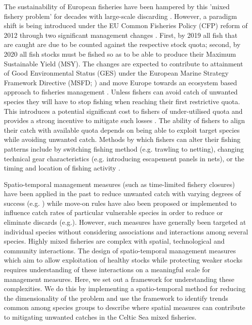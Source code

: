 \documentclass{nature}
\begin{document}
\begin{linenumbers}
The sustainability of European fisheries have been hampered by this 'mixed
fishery problem' for decades with large-scale discarding \cite{Borges2015,
	Uhlmann2014}.  However, a paradigm shift is being introduced under the
EU Common Fisheries Policy (CFP) reform of 2012 through two significant
management changes \cite{EuropeanParliamentandCounciloftheEuropeanUnion2013}.
First, by 2019 all fish that are caught are due to be counted against the
respective stock quota; second, by 2020 all fish stocks must be fished so as to
be able to produce their Maximum Sustainable Yield (MSY). The changes are
expected to contribute to attainment of Good Environmental Status (GES) under
the European Marine Strategy Framework Directive (MSFD;
\cite{EuropeanParliament2008}) and move Europe towards an ecosystem based
approach to fisheries management \cite{Garcia2003}. Unless fishers can avoid
catch of unwanted species they will have to stop fishing when reaching their
first restrictive quota. This introduces a potential significant cost to
fishers of under-utilised quota\cite{Hoff2010a, Ulrich2016} and provides a
strong incentive to mitigate such losses \cite{Condie2013, Condie2013a}. The
ability of fishers to align their catch with available quota depends on being
able to exploit target species while avoiding unwanted catch. Methods by which
fishers can alter their fishing patterns include by switching fishing method
(e.g. trawling to netting), changing technical gear characteristics (e.g.
introducing escapement panels in nets), or the timing and location of fishing
activity \cite{Fulton2011b, vanPutten2012a}.

Spatio-temporal management measures (such as time-limited fishery closures)
have been applied in the past to reduce unwanted catch with varying degrees of
success (e.g. \cite{Needle2011, Holmes2011, Beare2010, Dinmore2003}) while
move-on rules have also been proposed or implemented to influence catch rates
of particular vulnerable species in order to reduce or eliminate discards
(e.g.\cite{Gardner2008, Dunn2011, Dunn2014a}). However, such measures have
generally been targeted at individual species without considering associations
and interactions among several species. Highly mixed fisheries are complex with
spatial, technological and community interactions. The design of
spatio-temporal management measures which aim to allow exploitation of healthy
stocks while protecting weaker stocks requires understanding of these
interactions on a meaningful scale for management measures. Here, we set out a
framework for understanding these complexities. We do this by implementing a
spatio-temporal method for reducing the dimensionality of the problem and use
the framework to identify trends common among species groups to describe where
spatial measures can contribute to mitigating unwanted catches in the Celtic
Sea mixed fisheries.
 


\end{linenumbers}
\end{document}
